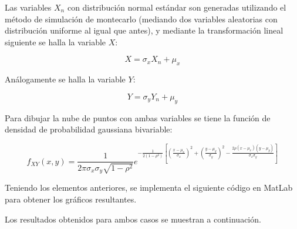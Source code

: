 Las variables $X_n$ con distribuci\'on normal est\'andar son generadas utilizando el m\'etodo de simulaci\'on de montecarlo (mediando dos variables aleatorias con distribuci\'on uniforme al igual que antes), y mediante la transformaci\'on lineal siguiente se halla la variable $X$:

\[
X = \sigma_x X_n + \mu_x
\]

An\'alogamente se halla la variable $Y$:

\[
Y = \sigma_y Y_n + \mu_y
\]

Para dibujar la nube de puntos con ambas variables se tiene la funci\'on de densidad de probabilidad gaussiana bivariable:

\[
f_{XY}(x,y) = \frac{1}{2 \pi \sigma_x \sigma_y \sqrt{1-\rho^2}} e^{- \frac{1}{2 \left(1-\rho^2\right)} \left[ \left( \frac{x-\mu_x}{\sigma_x} \right)^2 + \left( \frac{y-\mu_y}{\sigma_y} \right)^2 - \frac{2 \rho (x-\mu_x) (y-\mu_y)}{\sigma_x \sigma_y} \right]}
\]

Teniendo los elementos anteriores, se implementa el siguiente c\'odigo en MatLab para obtener los gr\'aficos resultantes.



Los resultados obtenidos para ambos casos se muestran a continuaci\'on.

